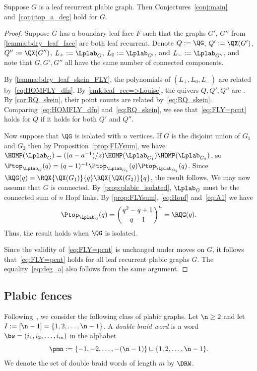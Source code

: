 \begin{theorem}
  Suppose $G$ is a leaf recurrent plabic graph. Then Conjectures~\ref{conj:main} and~\ref{conj:top_a_deg} hold for $G$.
\end{theorem}
\begin{proof}
  Suppose $G$ has a boundary leaf face $F$ such that the graphs $G'$, $G''$ from \cref{lemma:bdry_leaf_face} are both leaf recurrent. Denote $Q:=\QG$, $Q':=\QX(G')$, $Q'':=\QX(G'')$, $L_+:=\Lplab_G$, $L_0:=\Lplab_{G'}$, and $L_-:=\Lplab_{G''}$, and note that $G,G',G''$ all have the same number of connected components.

By \cref{lemma:bdry_leaf_skein_FLY}, the \FLY polynomials of $(L_+,L_0,L_-)$ are related by~\eqref{eq:HOMFLY_dfn}. By \cref{rmk:leaf_rec=>Louise}, the quivers $Q,Q',Q''$ are \Louise. By \cref{cor:RQ_skein}, their point counts are related by~\eqref{eq:RQ_skein}. Comparing~\eqref{eq:HOMFLY_dfn} and~\eqref{eq:RQ_skein}, we see that~\eqref{eq:FLY=pcnt} holds for $Q$ if it holds for both $Q'$ and $Q''$.

Now suppose that $\QG$ is isolated with $n$ vertices.  If $G$ is the disjoint union of $G_1$ and $G_2$ then by Proposition~\ref{prop:FLYsum}, we have $\HOMP(\Lplab_{G})= ((a-a^{-1})/z)\HOMP(\Lplab_{G_1})\HOMP(\Lplab_{G_2})$, so $\Ptop_{\Lplab_G}(q) = (q-1)^{-1} \Ptop_{\Lplab_{G_1}}(q)\Ptop_{\Lplab_{G_2}}(q)$.  Since $\RQG(q) = \RQX{\QX(G_1)}{q}\RQX{\QX(G_2)}{q}$, the result follows. We may now assume that $G$ is connected.  By \cref{prop:plabic_isolated}, $\Lplab_G$ must be the connected sum of $n$ Hopf links.  By \cref{prop:FLYsum}, \eqref{eq:Hopf} and~\eqref{eq:A1} we have 
$$\Ptop_{\Lplab_G}(q) = \left(\frac{q^2-q+1}{q-1}\right)^n = \RQG(q).
$$
Thus, the result holds when $\QG$ is isolated.

Since the validity of~\eqref{eq:FLY=pcnt} is unchanged under moves on $G$, it follows that~\eqref{eq:FLY=pcnt} holds for all leaf recurrent plabic graphs $G$.  The equality~\eqref{eq:deg_a} also follows from the same argument.
\end{proof}

\subsection{Plabic fences}\label{sec:plabic-fences}
Following~\cite[Section~12]{FPST}, we consider the following class of plabic graphs. Let $\n\geq 2$ and let $I:=[\n-1]=\{1,2,\dots,\n-1\}$. A \emph{double braid word} is a word $\bw=(i_1,i_2,\dots,i_m)$ in the alphabet
\begin{equation*}%
  \pmn:=\{-1,-2,\dots,-(\n-1)\}\sqcup\{1,2,\dots,\n-1\}.
\end{equation*}
We denote the set of double braid words of length $m$ by $\DRW$. 

